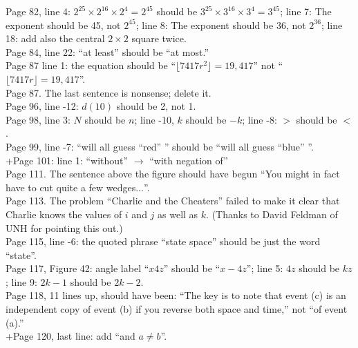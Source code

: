 \documentclass[11pt]{article}
\begin{document}
Page 82, line 4: $2^{25} \times 2^{16} \times 2^4 = 2^{45}$ should be $3^{25} \times 3^{16} \times 3^4 = 3^{45}$;
line 7: The exponent should be 45, not $2^{45}$;
line 8: The exponent should be 36, not $2^{36}$;
line 18: add also the central $2 \times 2$ square twice.\\

Page 84, line 22: ``at least'' should be ``at most.''\\

Page 87 line 1: the equation should be ``$\lfloor 7417r^2 \rfloor = 19,417$'' not
``$\lfloor 7417r \rfloor = 19,417$''. \\

Page 87.  The last sentence is nonsense; delete it.\\

Page 96, line -12: $d(10)$ should be 2, not 1.\\

Page 98, line 3: $N$ should be $n$; line -10, $k$ should be $-k$; line -8: $>$ should be $<$.\\

Page 99, line -7: ``will all guess ``red'' '' should be ``will all guess ``blue'' ''. \\

+Page 101: line 1: ``without'' $\to$ ``with negation of''\\

Page 111. The sentence above the figure should have begun ``You might in fact have to
cut quite a few wedges$\dots$''.\\

Page 113. The problem ``Charlie and the Cheaters'' failed to make it clear that Charlie knows
the values of $i$ and $j$ as well as $k$.  (Thanks to David Feldman of UNH for pointing this out.) \\

Page 115, line -6: the quoted phrase ``state space'' should be just the word ``state''. \\

Page 117, Figure 42: angle label ``$x4z$'' should be ``$x-4z$''; line 5: $4z$ should be $kz$;
line 9: $2k{-}1$ should be $2k{-}2$.\\

Page 118, 11 lines up, should have been: ``The key is to note that event (c) is an independent copy of event (b) if you reverse
both space and time,'' not ``of event (a).''\\

+Page 120, last line: add ``and $a\ne b$''.\\
\end{document}

